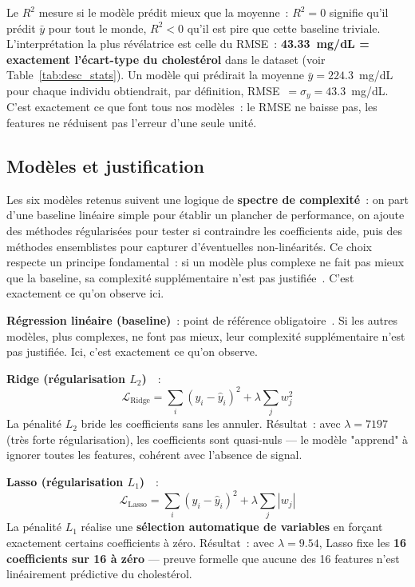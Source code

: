 Le $R^2$ mesure si le modèle prédit mieux que la moyenne~: $R^2 = 0$ signifie qu'il prédit $\bar{y}$ pour tout le monde, $R^2 < 0$ qu'il est pire que cette baseline triviale. L'interprétation la plus révélatrice est celle du RMSE~: \textbf{43.33~mg/dL = exactement l'écart-type du cholestérol} dans le dataset (voir Table~\ref{tab:desc_stats}). Un modèle qui prédirait la moyenne $\bar{y} = 224.3$~mg/dL pour chaque individu obtiendrait, par définition, RMSE~$= \sigma_y = 43.3$~mg/dL. C'est exactement ce que font tous nos modèles~: le RMSE ne baisse pas, les features ne réduisent pas l'erreur d'une seule unité.

\subsection{Modèles et justification}

Les six modèles retenus suivent une logique de \textbf{spectre de complexité}~: on part d'une baseline linéaire simple pour établir un plancher de performance, on ajoute des méthodes régularisées pour tester si contraindre les coefficients aide, puis des méthodes ensemblistes pour capturer d'éventuelles non-linéarités. Ce choix respecte un principe fondamental~: si un modèle plus complexe ne fait pas mieux que la baseline, sa complexité supplémentaire n'est pas justifiée~\cite{james2021}. C'est exactement ce qu'on observe ici.

\textbf{Régression linéaire (baseline)}~: point de référence obligatoire~\cite{james2021}. Si les autres modèles, plus complexes, ne font pas mieux, leur complexité supplémentaire n'est pas justifiée. Ici, c'est exactement ce qu'on observe.

\textbf{Ridge (régularisation $L_2$)}~\cite{hoerl1970}~:
\begin{equation}
\mathcal{L}_{\text{Ridge}} = \sum_{i}(y_i - \hat{y}_i)^2 + \lambda\sum_j w_j^2
\end{equation}
La pénalité $L_2$ bride les coefficients sans les annuler. Résultat~: avec $\lambda = 7197$ (très forte régularisation), les coefficients sont quasi-nuls --- le modèle "apprend" à ignorer toutes les features, cohérent avec l'absence de signal.

\textbf{Lasso (régularisation $L_1$)}~\cite{tibshirani1996}~:
\begin{equation}
\mathcal{L}_{\text{Lasso}} = \sum_{i}(y_i - \hat{y}_i)^2 + \lambda\sum_j |w_j|
\end{equation}
La pénalité $L_1$ réalise une \textbf{sélection automatique de variables} en forçant exactement certains coefficients à zéro. Résultat~: avec $\lambda = 9.54$, Lasso fixe les \textbf{16 coefficients sur 16 à zéro} --- preuve formelle que aucune des 16 features n'est linéairement prédictive du cholestérol.

